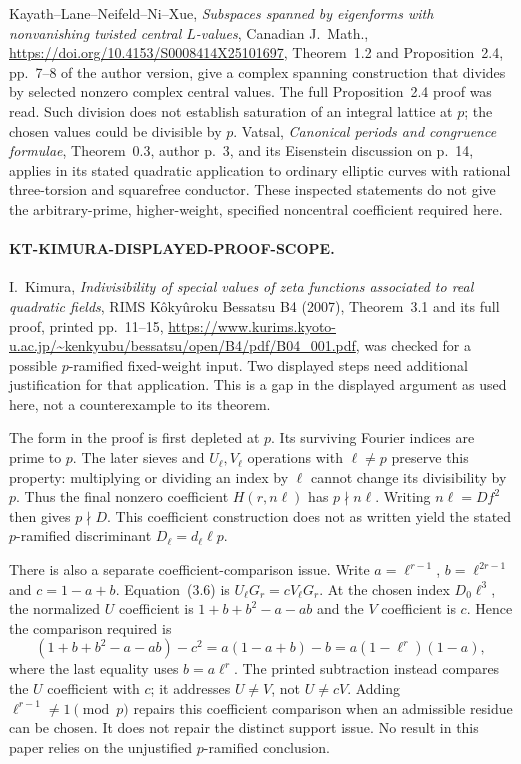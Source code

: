 Kayath--Lane--Neifeld--Ni--Xue, \emph{Subspaces spanned by
eigenforms with nonvanishing twisted central $L$-values},
Canadian J.~Math.,
\url{https://doi.org/10.4153/S0008414X25101697},
Theorem~1.2 and Proposition~2.4, pp.~7--8 of the author
version, give a complex spanning construction that divides
by selected nonzero complex central values.  The full
Proposition~2.4 proof was read.  Such division does not
establish saturation of an integral lattice at $p$;
the chosen values could be divisible by $p$.  Vatsal,
\emph{Canonical periods and congruence formulae},
Theorem~0.3, author p.~3, and its Eisenstein discussion
on p.~14, applies in its stated quadratic application to
ordinary elliptic curves with rational three-torsion and
squarefree conductor.  These inspected statements do not
give the arbitrary-prime, higher-weight, specified
noncentral coefficient required here.

\paragraph{KT-KIMURA-DISPLAYED-PROOF-SCOPE.}
I.~Kimura, \emph{Indivisibility of special values of zeta
functions associated to real quadratic fields},
RIMS K\^oky\^uroku Bessatsu B4 (2007), Theorem~3.1
and its full proof, printed pp.~11--15,
\url{https://www.kurims.kyoto-u.ac.jp/~kenkyubu/bessatsu/open/B4/pdf/B04_001.pdf},
was checked for a possible $p$-ramified fixed-weight input.
Two displayed steps need additional justification for
that application.  This is a gap in the displayed
argument as used here, not a counterexample to its theorem.

The form in the proof is first depleted at $p$.
Its surviving Fourier indices are prime to $p$.
The later sieves and $U_\ell,V_\ell$ operations with
$\ell\ne p$ preserve this property: multiplying or
dividing an index by $\ell$ cannot change its divisibility
by $p$.  Thus the final nonzero coefficient $H(r,n\ell)$
has $p\nmid n\ell$.  Writing $n\ell=Df^2$ then gives
$p\nmid D$.  This coefficient construction does not as
written yield the stated $p$-ramified discriminant
$D_\ell=d_\ell\ell p$.

There is also a separate coefficient-comparison issue.
Write $a=\ell^{r-1}$, $b=\ell^{2r-1}$ and $c=1-a+b$.
Equation~(3.6) is $U_\ell G_r=cV_\ell G_r$.
At the chosen index $D_0\ell^3$, the normalized
$U$ coefficient is $1+b+b^2-a-ab$ and the
$V$ coefficient is $c$.  Hence the comparison required is
\[
 (1+b+b^2-a-ab)-c^2
   =a(1-a+b)-b
   =a(1-\ell^r)(1-a),
 \tag{KS.1}
\]
where the last equality uses $b=a\ell^r$.
The printed subtraction instead compares the $U$
coefficient with $c$; it addresses $U\ne V$, not
$U\ne cV$.  Adding $\ell^{r-1}\ne1\pmod p$
repairs this coefficient comparison when an admissible
residue can be chosen.  It does not repair the distinct
support issue.  No result in this paper relies on the
unjustified $p$-ramified conclusion.

